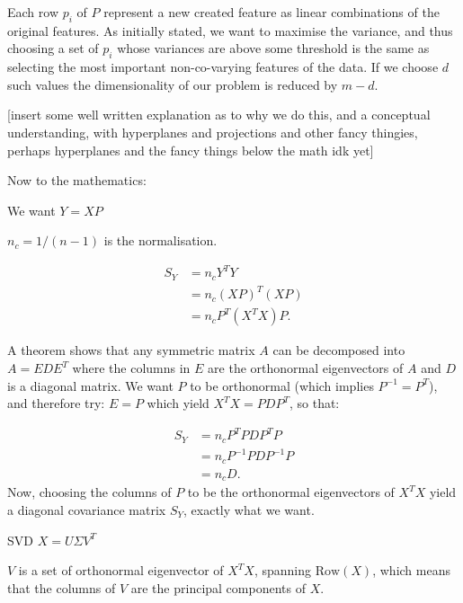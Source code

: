     Each row $p_i$ of $P$ represent a new created feature as linear combinations of the original features. As initially stated, we want to maximise the variance, and thus choosing a set of $p_i$ whose variances are above some threshold is the same as selecting the most important non-co-varying features of the data. If we choose $d$ such values the dimensionality of our problem is reduced by $m-d$.
    



    [insert some well written explanation as to why we do this, and a conceptual understanding, with hyperplanes and projections and other fancy thingies, perhaps hyperplanes and the fancy things below the math idk yet]

    Now to the mathematics:

    We want $Y = XP$

    $n_c = 1/(n-1)$ is the normalisation.

    \begin{align}
        S_Y &= n_cY^TY\nonumber\\
        &= n_c(XP)^T(XP) \nonumber\\
        &= n_cP^T(X^TX)P.
    \end{align} 

    A theorem shows that any symmetric matrix $A$ can be decomposed into $A=EDE^T$ where the columns in $E$ are the orthonormal eigenvectors of $A$ and $D$ is a diagonal matrix. We want $P$ to be orthonormal (which implies $P^{-1}=P^T$), and therefore try: $E=P$ which yield $X^TX=PDP^T$, so that:

    \begin{align}
        S_Y &= n_cP^TPDP^TP\nonumber\\
        &= n_cP^{-1}PDP^{-1}P\nonumber\\
        &= n_cD.
    \end{align}
    Now, choosing the columns of $P$ to be the orthonormal eigenvectors of $X^TX$ yield a diagonal covariance matrix $S_Y$, exactly what we want. 

    SVD $X=U\Sigma V^T$

    $V$ is a set of orthonormal eigenvector of $X^TX$, spanning $\mathrm{Row}(X)$, which means that the columns of $V$ are the principal components of $X$. 

